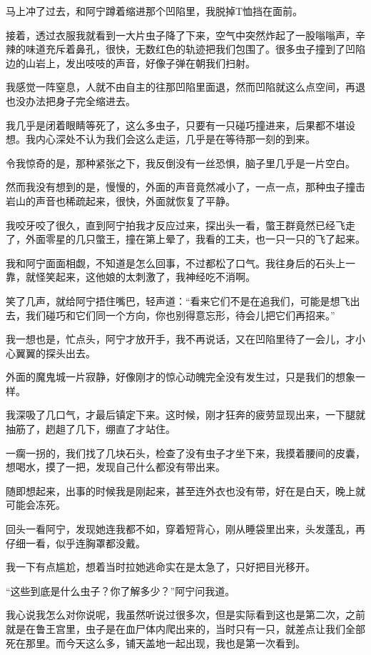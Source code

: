 马上冲了过去，和阿宁蹲着缩进那个凹陷里，我脱掉T恤挡在面前。

接着，透过衣服我就看到一大片虫子降了下来，空气中突然炸起了一股嗡嗡声，辛辣的味道充斥着鼻孔，很快，无数红色的轨迹把我们包围了。很多虫子撞到了凹陷边的山岩上，发出吱吱的声音，好像子弹在朝我们扫射。

我感觉一阵窒息，人就不由自主的往那凹陷里面退，然而凹陷就这么点空间，再退也没办法把身子完全缩进去。

我几乎是闭着眼睛等死了，这么多虫子，只要有一只碰巧撞进来，后果都不堪设想。我内心深处不认为我们会这么走运，几乎是在等待那一刻的到来。

令我惊奇的是，那种紧张之下，我反倒没有一丝恐惧，脑子里几乎是一片空白。

然而我没有想到的是，慢慢的，外面的声音竟然减小了，一点一点，那种虫子撞击岩山的声音也稀疏起来，很快，外面就恢复了平静。

我咬牙咬了很久，直到阿宁拍我才反应过来，探出头一看，蟞王群竟然已经飞走了，外面零星的几只蟞王，撞在第上晕了，我看的工夫，也一只一只的飞了起来。

我和阿宁面面相觑，不知道是怎么回事，不过都松了口气。我往身后的石头上一靠，就怪笑起来，这他娘的太刺激了，我神经吃不消啊。

笑了几声，就给阿宁捂住嘴巴，轻声道：“看来它们不是在追我们，可能是想飞出去，我们碰巧和它们同一个方向，你也别得意忘形，待会儿把它们再招来。”

我一想也是，忙点头，阿宁才放开手，我不再说话，又在凹陷里待了一会儿，才小心翼翼的探头出去。

外面的魔鬼城一片寂静，好像刚才的惊心动魄完全没有发生过，只是我们的想象一样。

我深吸了几口气，才最后镇定下来。这时候，刚才狂奔的疲劳显现出来，一下腿就抽筋了，趔趄了几下，绷直了才站住。

一瘸一拐的，我们找了几块石头，检查了没有虫子才坐下来，我摸着腰间的皮囊，想喝水，摸了一把，发现自己什么都没有带出来。

随即想起来，出事的时候我是刚起来，甚至连外衣也没有带，好在是白天，晚上就可能会冻死。

回头一看阿宁，发现她连我都不如，穿着短背心，刚从睡袋里出来，头发蓬乱，再仔细一看，似乎连胸罩都没戴。

我一下有点尴尬，想着当时拉她逃命实在是太急了，只好把目光移开。

“这些到底是什么虫子？你了解多少？”阿宁问我道。

我心说我怎么对你说呢，我虽然听说过很多次，但是实际看到这也是第二次，之前就是在鲁王宫里，虫子是在血尸体内爬出来的，当时只有一只，就差点让我们全部死在那里。而今天这么多，铺天盖地一起出现，我也是第一次看到。

